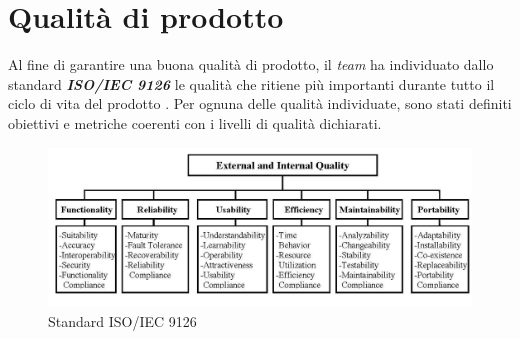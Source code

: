\newpage
\section{Qualità di prodotto}
	
Al fine di garantire una buona qualità di prodotto, il \textit{team} ha individuato dallo standard \textbf{\textit{ISO/IEC 9126}} le qualità che ritiene più importanti durante tutto il ciclo di vita del prodotto \progetto. Per ognuna delle qualità individuate, sono stati definiti obiettivi e metriche coerenti con i livelli di qualità dichiarati.

\begin{figure}[H]
	\centering
	\includegraphics[scale=0.33]{includes/img/9126.png}
	\caption{Standard ISO/IEC 9126}
\end{figure}

